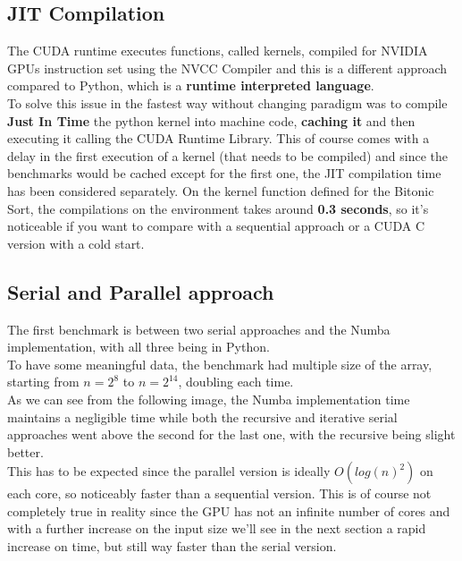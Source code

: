 \documentclass[a4paper, 12pt, oneside]{article}
\begin{document}
\subsection{JIT Compilation}
The CUDA runtime executes functions, called kernels, compiled for NVIDIA GPUs instruction set using the NVCC Compiler \cite{nvcc} and this is a different approach compared to Python, which is a \textbf{runtime interpreted language}.\\
To solve this issue in the fastest way without changing paradigm was to compile \textbf{Just In Time} the python kernel into machine code, \textbf{caching it} and then executing it calling the CUDA Runtime Library.
This of course comes with a delay in the first execution of a kernel (that needs to be compiled) and since the benchmarks would be cached except for the first one, the JIT compilation time has been considered separately.
On the kernel function defined for the Bitonic Sort, the compilations on the environment takes around \textbf{0.3 seconds}, so it's noticeable if you want to compare with a sequential approach or a CUDA C version with a cold start.

\subsection{Serial and Parallel approach}

The first benchmark is between two serial approaches and the Numba implementation, with all three being in Python.\\
To have some meaningful data, the benchmark had multiple size of the array, starting from $n=2^8$ to $n=2^14$, doubling each time.\\
As we can see from the following image, the Numba implementation time maintains a negligible time while both the recursive and iterative serial approaches went above the second for the last one, with the recursive being slight better.\\
This has to be expected since the parallel version is ideally $O(log(n)^2)$ on each core, so noticeably faster than a sequential version. This is of course not completely true in reality since the GPU has not an infinite number of cores and with a further increase on the input size we'll see in the next section a rapid increase on time, but still way faster than the serial version.
\end{document}
